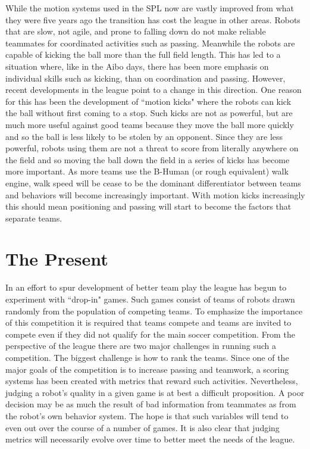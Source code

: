 \documentclass{llncs}
\begin{document}
While the motion systems used in the SPL now are vastly improved from what they were
five years ago the transition has cost the league in other areas. Robots that
are slow, not agile, and prone to falling down do not make reliable teammates 
for coordinated activities such as passing. Meanwhile the robots are
capable of kicking the ball more than the full field length. This has led
to a situation where, like in the Aibo days, there has been more emphasis
on individual skills such as kicking, than on coordination and passing.
However, recent developments in the league point to a change in this
direction. One reason for this has been the development of ``motion
kicks" where the robots can kick the ball without first coming to a stop.
Such kicks are not as powerful, but are much more useful against good teams because they
move the ball more quickly and so the ball is less likely to be stolen
by an opponent. Since they are less powerful, robots using them are not
a threat to score from literally anywhere on the field and so moving the
ball down the field in a series of kicks has become more important.
As more teams use the B-Human (or rough equivalent)
walk engine, walk speed will be cease to be the dominant differentiator
between teams and behaviors will become increasingly important. With
motion kicks increasingly this should mean positioning and passing will
start to become the factors that separate teams.

\section{The Present}

In an effort to spur development of better team play the league has
begun to experiment with ``drop-in" games. Such games consist of
teams of robots drawn randomly from the population of competing
teams. To emphasize the
importance of this competition it is required that teams compete and teams
are invited to compete even if they did not qualify for the main soccer
competition. From the perspective of the league there are two major challenges
in running such a competition. The biggest challenge is how to rank
the teams. Since one of the major goals of the competition is to increase
passing and teamwork, a scoring systems has been created with metrics
that reward such activities. Nevertheless, judging a robot's quality in
a given game is at best a difficult proposition. A poor decision may be
as much the result of bad information from teammates as from the robot's
own behavior system. The hope is that such variables will tend to even
out over the course of a number of games. It is also clear that judging
metrics will necessarily evolve over time to better meet the needs of the
league.
\end{document}
